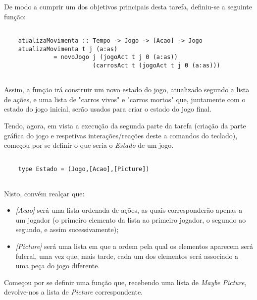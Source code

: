 \documentclass[a4paper]{report} %
\begin{document}
  \par \noindent De modo a cumprir um dos objetivos principais desta tarefa, definiu-se a seguinte função:
  
  \begin{verbatim}
    
    atualizaMovimenta :: Tempo -> Jogo -> [Acao] -> Jogo
    atualizaMovimenta t j (a:as) 
              = novoJogo j (jogoAct t j 0 (a:as)) 
                         (carrosAct t (jogoAct t j 0 (a:as)))
    
  \end{verbatim}
  
  \par \noindent Assim, a função irá construir um novo estado do jogo, atualizado segundo a lista de ações, e uma lista de "carros vivos" e "carros mortos" que, juntamente com o estado do jogo inicial, serão usados para criar o estado do jogo final.
  
  \par \noindent Tendo, agora, em vista a execução da segunda parte da tarefa (criação da parte gráfica do jogo e respetivas interações/reações deste a comandos do teclado), começou por se definir o que seria o \textit{Estado} de um jogo.
  
  \begin{verbatim}
      
    type Estado = (Jogo,[Acao],[Picture]) 
      
  \end{verbatim}
  
  \par \noindent Nisto, convém realçar que:
  
  \begin{itemize}
      
      \item \textit{[Acao]} será uma lista ordenada de ações, as quais corresponderão apenas a um jogador (o primeiro elemento da lista ao primeiro jogador, o segundo ao segundo, e assim sucessivamente);
      
      \item \textit{[Picture]} será uma lista em que a ordem pela qual os elementos aparecem será fulcral, uma vez que, mais tarde, cada um dos elementos será associado a uma peça do jogo diferente.
      
  \end{itemize}
  
  \par \noindent Começou por se definir uma função que, recebendo uma lista de \textit{Maybe Picture}, devolve-nos a lista de \textit{Picture} correspondente.
  
\end{document}
